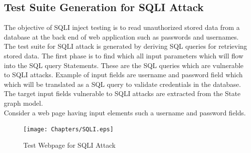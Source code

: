 \subsection{Test Suite Generation for SQLI Attack}

The objective of SQLI inject testing is to read unauthorized stored data from a database at the back end of web application such as passwords and usernames. The test suite for SQLI attack is generated by deriving SQL queries for retrieving stored data.  The first phase is to find which all input parameters which will flow into the SQL query Statements. These are the SQL queries which are vulnerable to SQLI attacks. Example of input fields are username and password field which which will be translated as a SQL query to validate credentials in the database. The target input fields vulnerable to SQLI attacks are extracted from the State graph model. \\

Consider a web page having input elements such a username and password fields.

\begin{figure}[!h]
 \begin{center}
    \resizebox{100mm}{75mm} {\texttt{[image: Chapters/SQLI.eps]}}
    \caption {Test Webpage for SQLI Attack}
  \label{fig:Table}
 \end{center}
\end{figure}


